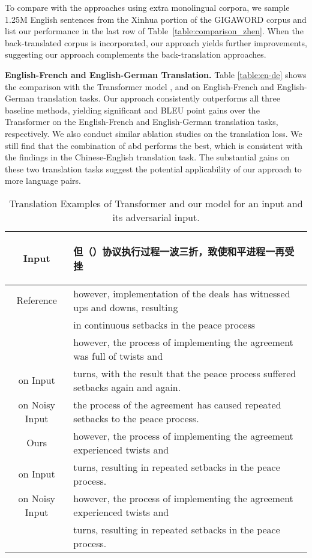 \documentclass[11pt,a4paper]{article}
\begin{document}
To compare with the approaches using extra monolingual corpora, we sample 1.25M English sentences from the Xinhua portion of the GIGAWORD corpus and list our performance in the last row of Table~\ref{table:comparison_zhen}.
When the back-translated corpus is incorporated, our approach yields further improvements, suggesting our approach complements the back-translation approaches. 


\noindent\textbf{English-French and English-German Translation.} Table \ref{table:en-de} shows the comparison with the Transformer model \cite{Vaswani:17}, \citet{Sano:19} and \citet{Cheng:19} on English-French and English-German translation tasks.
Our approach consistently outperforms all three baseline methods, yielding significant  and  BLEU point gains over the Transformer on the English-French and English-German translation tasks, respectively.
We also conduct similar ablation studies on the translation loss.
We still find that the combination of  abd  performs the best, which is consistent with the findings in the Chinese-English translation task.
The substantial gains on these two translation tasks suggest the potential applicability of our approach to more language pairs.

\begin{table*}[!t]
\centering
\begin{tabular}{c|l}
\hline
  Input & \begin{CJK*}{UTF8}{gbsn}{但（{\color{red}{但是}}）协议执行过程一波三折，致使和平进程一再受挫}\end{CJK*}\\
 \hline
 Reference & however, implementation of the deals has witnessed ups and downs, resulting \\ & in continuous setbacks in the peace process \\
\hline \hline
\citeauthor{Vaswani:17} & however, the process of implementing the agreement was full of twists and \\ 
on Input  &turns, with the result that the peace process suffered setbacks again and again.\\
\hline

on Noisy Input & the process of the agreement has caused repeated setbacks to the peace process.       \\
\hline \hline
Ours & however, the process of implementing the agreement experienced twists and \\
on Input &turns, resulting in repeated setbacks in the peace process.\\
\hline
on Noisy Input & however, the process of implementing the agreement experienced twists and\\
    &turns, resulting in repeated setbacks in the peace process. \\
\hline
\end{tabular}
\caption{Translation Examples of Transformer and our model for an input and its adversarial input.}
\label{table:robust_examples} 
\end{table*}
\end{document}
